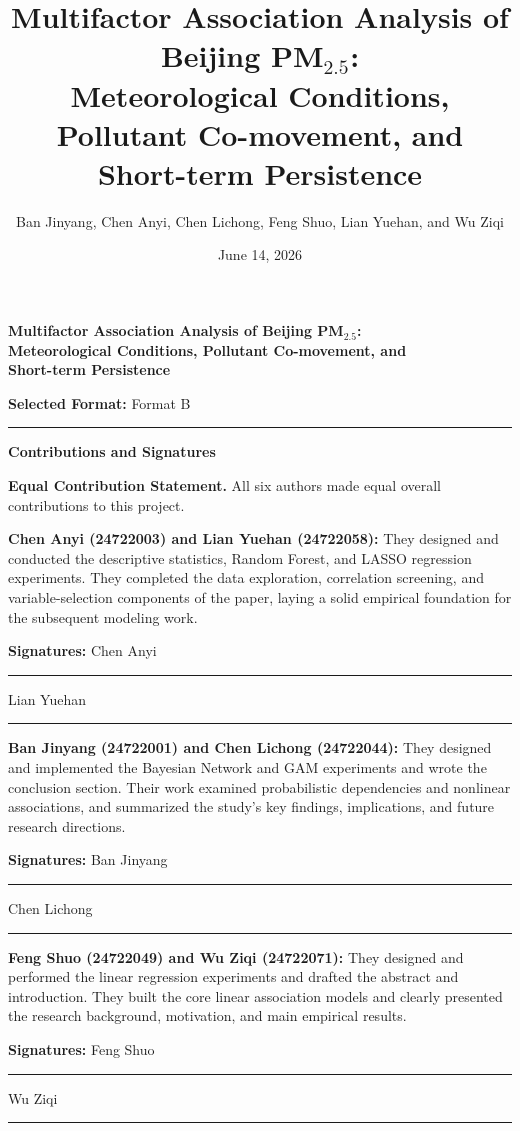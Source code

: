 \documentclass[11pt]{article}
\title{Multifactor Association Analysis of Beijing PM$_{2.5}$:\\Meteorological Conditions, Pollutant Co-movement, and Short-term Persistence}
\author{Ban Jinyang, Chen Anyi, Chen Lichong, Feng Shuo, Lian Yuehan, and Wu Ziqi}
\date{June 14, 2026}
\begin{document}
\begin{titlepage}
\thispagestyle{fancy}
\centering
\vspace*{0.85cm}

{\bfseries\fontsize{18}{22}\selectfont
Multifactor Association Analysis of Beijing PM$_{2.5}$:\\[0.35em]
Meteorological Conditions, Pollutant Co-movement, and\\[0.35em]
Short-term Persistence\par}

\vspace{0.45cm}
{\normalsize\textbf{Selected Format:} Format B\par}

\vspace{0.50cm}
\rule{0.78\textwidth}{0.5pt}

\vspace{0.65cm}
{\large\bfseries Contributions and Signatures\par}

\vspace{0.45cm}
\begin{minipage}{0.92\textwidth}
\small
\raggedright
\setlength{\parskip}{0.52em}
\setlength{\parindent}{0pt}

\textbf{Equal Contribution Statement.} All six authors made equal overall contributions to this project.

\textbf{Chen Anyi (24722003) and Lian Yuehan (24722058):} They designed and conducted the descriptive statistics, Random Forest, and LASSO regression experiments. They completed the data exploration, correlation screening, and variable-selection components of the paper, laying a solid empirical foundation for the subsequent modeling work.

\textbf{Signatures:} Chen Anyi \rule{3.7cm}{0.4pt}\hfill Lian Yuehan \rule{3.7cm}{0.4pt}

\textbf{Ban Jinyang (24722001) and Chen Lichong (24722044):} They designed and implemented the Bayesian Network and GAM experiments and wrote the conclusion section. Their work examined probabilistic dependencies and nonlinear associations, and summarized the study's key findings, implications, and future research directions.

\textbf{Signatures:} Ban Jinyang \rule{3.7cm}{0.4pt}\hfill Chen Lichong \rule{3.7cm}{0.4pt}

\textbf{Feng Shuo (24722049) and Wu Ziqi (24722071):} They designed and performed the linear regression experiments and drafted the abstract and introduction. They built the core linear association models and clearly presented the research background, motivation, and main empirical results.

\textbf{Signatures:} Feng Shuo \rule{3.7cm}{0.4pt}\hfill Wu Ziqi \rule{3.7cm}{0.4pt}

\end{minipage}
\end{titlepage}
\end{document}
